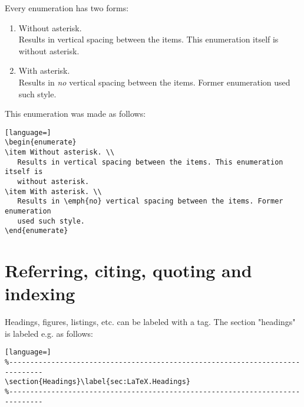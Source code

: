 \noindent
Every enumeration has two forms:
\begin{enumerate}
\item Without asterisk. \\
   Results in vertical spacing between the items. This enumeration itself is
   without asterisk.
\item With asterisk. \\
   Results in \emph{no} vertical spacing between the items. Former enumeration
   used such style.
\end{enumerate}

\noindent
This enumeration was made as follows:

\begin{lstlisting}[language=]
\begin{enumerate}
\item Without asterisk. \\
   Results in vertical spacing between the items. This enumeration itself is
   without asterisk.
\item With asterisk. \\
   Results in \emph{no} vertical spacing between the items. Former enumeration
   used such style.
\end{enumerate}
\end{lstlisting}

\section{Referring, citing, quoting and indexing}\label{sec:LaTeX.Ref}

Headings, figures, listings, etc. can be labeled with a tag. The section
"headings" is labeled e.g. as follows:

\begin{lstlisting}[language=]
%------------------------------------------------------------------------------
\section{Headings}\label{sec:LaTeX.Headings}
%------------------------------------------------------------------------------
\end{lstlisting}


